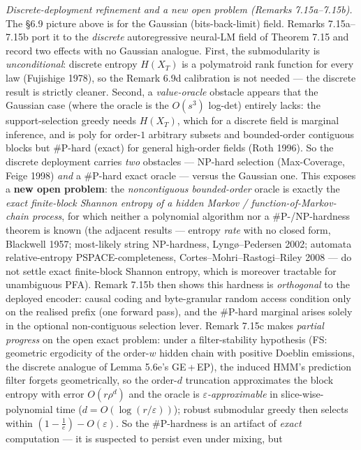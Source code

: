 \documentclass[
]{article}
\begin{document}
\emph{Discrete-deployment refinement and a new open problem (Remarks
7.15a--7.15b).} The §6.9 picture above is for the Gaussian (bits-back-limit)
field. Remarks 7.15a--7.15b port it to the \emph{discrete} autoregressive
neural-LM field of Theorem 7.15 and record two effects with no Gaussian
analogue. First, the submodularity is \emph{unconditional}: discrete entropy
$H(X_T)$ is a polymatroid rank function for every law (Fujishige 1978), so the
Remark 6.9d calibration is not needed --- the discrete result is strictly
cleaner. Second, a \emph{value-oracle} obstacle appears that the Gaussian case
(where the oracle is the $O(s^3)$ log-det) entirely lacks: the support-selection
greedy needs $H(X_T)$, which for a discrete field is marginal inference, and is
poly for order-$1$ arbitrary subsets and bounded-order contiguous blocks but
\#P-hard (exact) for general high-order fields (Roth 1996). So the discrete
deployment carries \emph{two} obstacles --- NP-hard selection (Max-Coverage,
Feige 1998) \emph{and} a \#P-hard exact oracle --- versus the Gaussian one. This
exposes a \textbf{new open problem}: the \emph{noncontiguous bounded-order}
oracle is exactly the \emph{exact finite-block Shannon entropy of a hidden
Markov / function-of-Markov-chain process}, for which neither a polynomial
algorithm nor a \#P-/NP-hardness theorem is known (the adjacent results ---
entropy \emph{rate} with no closed form, Blackwell 1957; most-likely string
NP-hardness, Lyng\o{}--Pedersen 2002; automata relative-entropy
PSPACE-completeness, Cortes--Mohri--Rastogi--Riley 2008 --- do not settle exact
finite-block Shannon entropy, which is moreover tractable for unambiguous PFA).
Remark 7.15b then shows this hardness is \emph{orthogonal} to the deployed
encoder: causal coding and byte-granular random access condition only on the
realised prefix (one forward pass), and the \#P-hard marginal arises solely in
the optional non-contiguous selection lever. Remark 7.15c makes \emph{partial
progress} on the open exact problem: under a filter-stability hypothesis (FS:
geometric ergodicity of the order-$w$ hidden chain with positive Doeblin
emissions, the discrete analogue of Lemma 5.6e's GE\,+\,EP), the induced HMM's
prediction filter forgets geometrically, so the order-$d$ truncation
approximates the block entropy with error $O(r\rho^d)$ and the oracle is
\emph{$\varepsilon$-approximable} in slice-wise-polynomial time
($d=O(\log(r/\varepsilon))$); robust submodular greedy then selects within
$(1-\tfrac1e)-O(\varepsilon)$. So the \#P-hardness is an artifact of
\emph{exact} computation --- it is suspected to persist even under mixing, but
\end{document}
